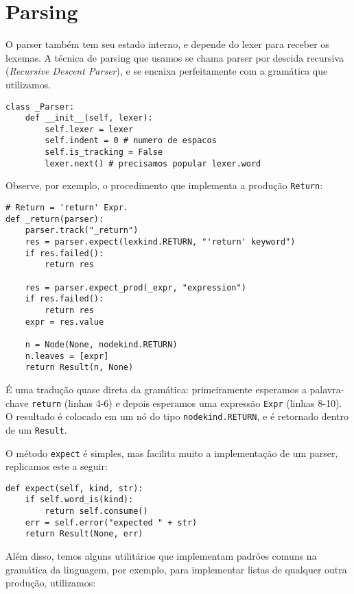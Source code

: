 \section{Parsing}

O parser também tem seu estado interno, e depende
do lexer para receber os lexemas. A técnica de parsing
que usamos se chama parser por descida recursiva
(\textit{Recursive Descent Parser}), e se encaixa
perfeitamente com a gramática que utilizamos.

\begin{lstlisting}
class _Parser:
    def __init__(self, lexer):
        self.lexer = lexer
        self.indent = 0 # numero de espacos
        self.is_tracking = False
        lexer.next() # precisamos popular lexer.word
\end{lstlisting}

Observe, por exemplo, o procedimento que implementa
a produção \verb|Return|:

\begin{lstlisting}
# Return = 'return' Expr.
def _return(parser):
    parser.track("_return")
    res = parser.expect(lexkind.RETURN, "'return' keyword")
    if res.failed():
        return res

    res = parser.expect_prod(_expr, "expression")
    if res.failed():
        return res
    expr = res.value

    n = Node(None, nodekind.RETURN)
    n.leaves = [expr]
    return Result(n, None)
\end{lstlisting}

É uma tradução quase direta da gramática:
primeiramente esperamos a palavra-chave \verb|return|
(linhas 4-6) e
depois esperamos uma expressão \verb|Expr|
(linhas 8-10). O resultado é colocado
em um nó do tipo \verb|nodekind.RETURN|, e é retornado
dentro de um \verb|Result|.

O método \verb|expect| é simples, mas facilita muito a
implementação de um parser, replicamos este a seguir:

\begin{lstlisting}
def expect(self, kind, str):
    if self.word_is(kind):
        return self.consume()
    err = self.error("expected " + str)
    return Result(None, err)
\end{lstlisting}

Além disso, temos alguns utilitários que implementam padrões
comuns na gramática da linguagem, por exemplo,
para implementar listas de qualquer outra produção,
utilizamos:

